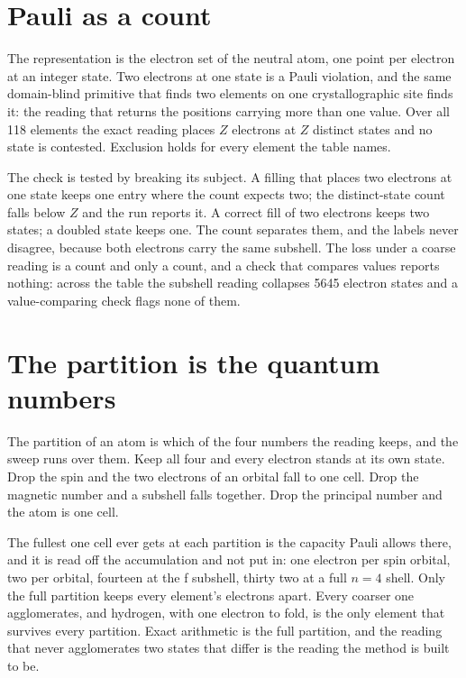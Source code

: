 \section{Pauli as a count}

The representation is the electron set of the neutral atom, one point per electron at an integer
state. Two electrons at one state is a Pauli violation, and the same domain-blind primitive that finds
two elements on one crystallographic site finds it: the reading that returns the positions carrying
more than one value. Over all 118 elements the exact reading places $Z$ electrons at $Z$ distinct
states and no state is contested. Exclusion holds for every element the table names.

The check is tested by breaking its subject. A filling that places two electrons at one state keeps
one entry where the count expects two; the distinct-state count falls below $Z$ and the run reports
it. A correct fill of two electrons keeps two states; a doubled state keeps one. The count separates
them, and the labels never disagree, because both electrons carry the same subshell. The loss under a
coarse reading is a count and only a count, and a check that compares values reports nothing: across
the table the subshell reading collapses 5645 electron states and a value-comparing check flags none
of them.

\section{The partition is the quantum numbers}

The partition of an atom is which of the four numbers the reading keeps, and the sweep runs over
them. Keep all four and every electron stands at its own state. Drop the spin and the two electrons
of an orbital fall to one cell. Drop the magnetic number and a subshell falls together. Drop the
principal number and the atom is one cell.

The fullest one cell ever gets at each partition is the capacity Pauli allows there, and it is read
off the accumulation and not put in: one electron per spin orbital, two per orbital, fourteen at the
f subshell, thirty two at a full $n = 4$ shell. Only the full partition keeps every element's
electrons apart. Every coarser one agglomerates, and hydrogen, with one electron to fold, is the only
element that survives every partition. Exact arithmetic is the full partition, and the reading that
never agglomerates two states that differ is the reading the method is built to be.
